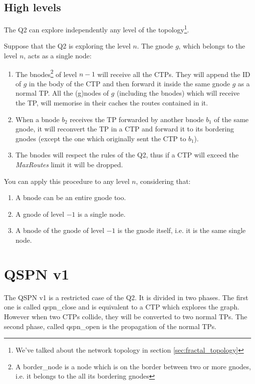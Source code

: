 \documentclass[a4paper]{article}
\begin{document}
\subsection{High levels}
The Q2 can explore independently any level of the topology\footnote{We've
talked about the network topology in section \ref{sec:fractal_topology}}.

Suppose that the Q2 is exploring the level $n$. The gnode $g$, which belongs
to the level $n$, acts as a single node:
\begin{enumerate}
	\item The bnodes\footnote{A border\_node is a node which is on the
		border between two or more gnodes, i.e. it belongs to the all
		its bordering gnodes} of level $n-1$ will receive all the CTPs.
		They will append the ID of $g$ in the body of the CTP and then
		forward it inside the same gnode $g$ as a normal TP.
		All the (g)nodes of $g$ (including the bnodes) which will
		receive the TP, will memorise in their caches the routes
		contained in it.
	\item When a bnode $b_2$ receives the TP forwarded by another bnode
		$b_1$ of the same gnode, it will reconvert the TP in a CTP and
		forward it to its bordering gnodes (except the one which
		originally sent the CTP to $b_1$).
	\item The bnodes will respect the rules of the Q2, thus if a CTP will
		exceed the \emph{MaxRoutes} limit it will be dropped. 
\end{enumerate}
You can apply this procedure to any level $n$, considering that:
\begin{enumerate}
	\item A bnode can be an entire gnode too.
	\item A gnode of level $-1$ is a single node.
	\item A bnode of the gnode of level $-1$ is the gnode itself, i.e. it
		is the same single node.
\end{enumerate}

\section{QSPN v1}
\label{sec:QSPNv1}
The QSPN v1 is a restricted case of the Q2.
It is divided in two phases. The first one is called qspn\_close and is equivalent
to a CTP which explores the graph. However when two CTPs collide, they will be
converted to two normal TPs. The second phase, called qspn\_open is the
propagation of the normal TPs.
\end{document}
